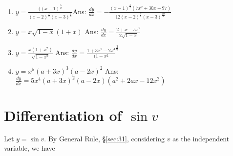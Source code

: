 \begin{enumerate}
\item
$y = \frac{((x - 1)^{\frac{5}{2}}}{(x - 2)^{\frac{3}{4}}(x - 3)^{\frac{7}{3}}}$\qquad\qquad\qquad\qquad\qquad\qquad Ans: 	
$\frac{dy}{dx} 
= -\frac{(x - 1)^{\frac{3}{2}}(7x^2 + 30x - 97)}{12(x - 2)^{\frac{7}{4}}(x - 3)^{\frac{10}{3}}}$

\item
$y = x \sqrt{1 - x} (1 + x)$
\qquad\qquad\qquad\qquad\qquad\qquad Ans: 
 	$\frac{dy}{dx} = \frac{2 + x - 5x^2}{2\sqrt{1 - x}}$

\item
$y = \frac{x(1 + x^2)}{\sqrt{1 - x^2}}$ 
	\qquad\qquad\qquad\qquad\qquad\qquad Ans: 
$\frac{dy}{dx} = \frac{1 + 3x^2 - 2x^4}{(1 - x^2}^{\frac{3}{2}}$

\item
$y = x^5(a + 3x)^3(a - 2x)^2$\qquad\qquad\qquad
{\scriptsize{Ans: 	
$\frac{dy}{dx} = 5x^4(a + 3x)^2(a - 2x)(a^2 + 2ax - 12x^2)$}}

\end{enumerate}


\section{Differentiation of $\sin v$}

Let 	$y 	= \sin v$.
By General Rule, \S \ref{sec:31}, %
considering $v$ as the independent variable, we have

